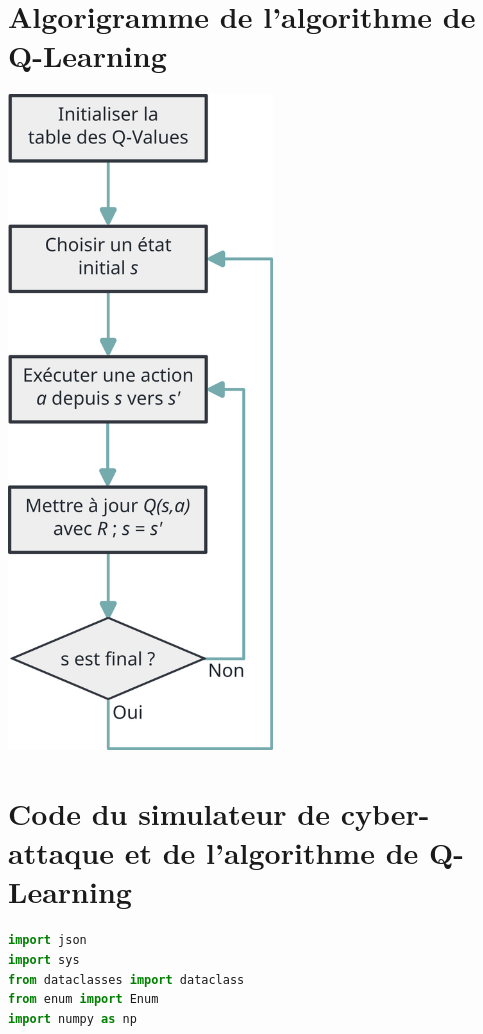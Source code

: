 \documentclass[a4paper]{article}
\begin{document}
    \begin{appendices}
        
    \section{Algorigramme de l'algorithme de Q-Learning}

    \begin{center}
        \includegraphics[width=7cm]{algo.png}
    \end{center}

    \newpage

    \section{Code du simulateur de cyber-attaque et de l'algorithme de Q-Learning}

    \begin{lstlisting}[language=python]
import json
import sys
from dataclasses import dataclass
from enum import Enum
import numpy as np


\end{lstlisting}
\end{appendices}
\end{document}
